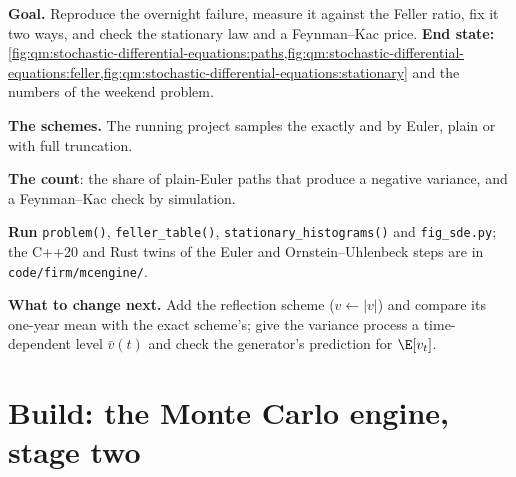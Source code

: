 \begin{tutorial}
\textbf{Goal.} Reproduce the overnight failure, measure it against the Feller ratio, fix it two
ways, and check the stationary law and a Feynman--Kac price. \textbf{End state:}
\cref{fig:qm:stochastic-differential-equations:paths,fig:qm:stochastic-differential-equations:feller,fig:qm:stochastic-differential-equations:stationary}
and the numbers of the weekend problem.
\begin{tutsteps}
\item \textbf{The schemes.} The running project samples the  exactly and by
Euler, plain or with full truncation.
\label{lst:qm:stochastic-differential-equations:sqrt}
\item \textbf{The count}: the share of plain-Euler paths that produce a negative variance, and a
Feynman--Kac check by simulation.
\label{lst:qm:stochastic-differential-equations:fk}
\item \textbf{Run} \texttt{problem()}, \texttt{feller\_table()}, \texttt{stationary\_histograms()} and
\texttt{fig\_sde.py}; the C++20 and Rust twins of the Euler and Ornstein--Uhlenbeck steps are in
\texttt{code/firm/mcengine/}.
\end{tutsteps}
\textbf{What to change next.} Add the reflection scheme ($v \leftarrow |v|$) and compare its one-year
mean with the exact scheme's; give the variance process a time-dependent level $\bar v(t)$ and
check the generator's prediction for $\E[v_t]$.
\end{tutorial}

\section{Build: the Monte Carlo engine, stage two}\label{bld:qm:stochastic-differential-equations:mcengine}

